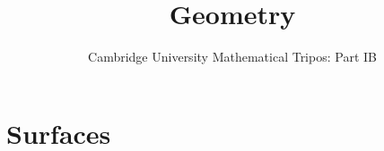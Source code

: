 \documentclass{article}
\title{Geometry}
\author{Cambridge University Mathematical Tripos: Part IB}
\begin{document}
\maketitle

\tableofcontentsnewpage{}

\section{Surfaces}

\end{document}
